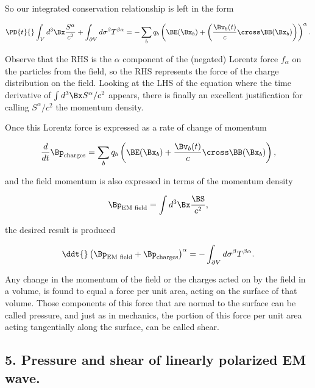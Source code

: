 So our integrated conservation relationship is left in the form

\begin{equation}\label{eqn:relativisticElectrodynamicsPS6P1:270}
\PD{t}{} \int_V d^3 \Bx \frac{S^\alpha}{c^2} 
+ 
\int_{\partial V} d \sigma^\beta T^{\beta \alpha}
= -
\sum_b q_b \left( \BE(\Bx_b) + \left( \frac{\Bv_b(t)}{c} \cross \BB(\Bx_b) \right) \right)^\alpha .
\end{equation}

Observe that the RHS is the $\alpha$ component of the (negated) Lorentz force $f_\alpha$ on the particles from the field, so the RHS represents the force of the charge distribution on the field.  Looking at the LHS of the equation where the time derivative of $\int d^3\Bx S^\alpha/c^2$ appears, there is finally an excellent justification for calling $S^\alpha/c^2$ the momentum density.

Once this Lorentz force is expressed as a rate of change of momentum

\begin{equation}\label{eqn:relativisticElectrodynamicsPS6P1:290}
\frac{d}{dt} \Bp_{\text{charges}} = \sum_b q_b \left( \BE(\Bx_b) + \frac{\Bv_b(t)}{c} \cross \BB(\Bx_b) \right),
\end{equation}

and the field momentum is also expressed in terms of the momentum density

\begin{equation}\label{eqn:relativisticElectrodynamicsPS6P1:310}
\Bp_{\text{EM field}} = \int d^3 \Bx \frac{\BS}{c^2},
\end{equation}

the desired result is produced

\begin{equation}\label{eqn:relativisticElectrodynamicsPS6P1:330}
\ddt{} \left( \Bp_{\text{EM field}} + \Bp_{\text{charges}} \right)^\alpha = -\int_{\partial V} d \sigma^\beta T^{\beta \alpha}.
\end{equation}

Any change in the momentum of the field or the charges acted on by the field in a volume, is found to equal a force per unit area, acting on the surface of that volume.  Those components of this force that are normal to the surface can be called pressure, and just as in mechanics, the portion of this force per unit area acting tangentially along the surface, can be called shear.

\subsection{5. Pressure and shear of linearly polarized EM wave.}

